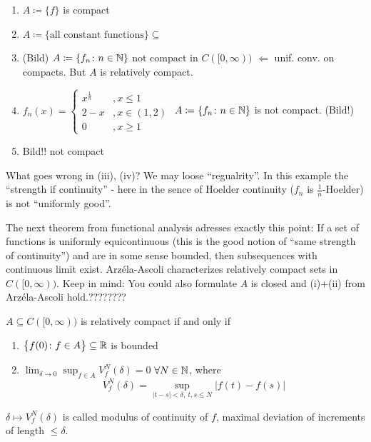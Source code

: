 \begin{example1}
	\begin{enumerate}[label=(\roman*)]
		\item $A \coloneqq \{ f \}$ is compact
		\item $A \coloneqq \{ \text{all constant functions}\} \subseteq$
		\item (Bild) $A \coloneqq \{ f_n \colon n\in \mathbb{N}\}$ not compact in $C([0,\infty))$ $\Leftarrow$ unif. conv. on compacts. But $A$ is relatively compact.
		\item $f_n(x) = \begin{cases}
			x^{\frac{1}{n}} &, x \leq 1 \\
			2-x &, x\in (1,2) \\
			0 &, x\geq 1
		\end{cases}$
		$A \coloneqq \{ f_n \colon n\in \mathbb{N}\}$ is not compact. (Bild!)
		\item Bild!! not compact
	\end{enumerate}
	What goes wrong in (iii), (iv)? We may loose \enquote{regualrity}. In this example the \enquote{strength if continuity} - here in the sence of Hoelder continuity ($f_n$ is $\frac{1}{n}$-Hoelder) is not \enquote{uniformly good}.
\end{example1}
The next theorem from functional analysis adresses exactly this point: If a set of functions is uniformly equicontinuous (this is the good notion of \enquote{same strength of continuity}) and are in some sense bounded, then subsequences with continuous limit exist. Arz\'ela-Ascoli characterizes relatively compact sets in $C([0,\infty))$. Keep in mind: You could also formulate $A$ is closed and (i)+(ii) from Arz\'ela-Ascoli hold.????????
\begin{lsatz}
\begin{theorem}
	$A \subseteq C([0,\infty))$ is relatively compact if and only if 
	\begin{enumerate}[label=(\roman*)]
		\item $\big\{ f(0)\colon f\in A\big\} \subseteq \mathbb{R}$ is bounded
		\item $\lim_{\delta \to 0} \sup_{f\in A} V_f^N(\delta) = 0 $   $\forall N \in \mathbb{N}$, where $$V_f^N(\delta) = \sup_{\lvert t - s \rvert < \delta, \: t,s \leq N} \lvert f(t)- f(s) \rvert$$
	\end{enumerate}
\end{theorem}
\end{lsatz}
$\delta \mapsto V_f^N(\delta)$ is called modulus of continuity of $f$, maximal deviation of increments of length $\leq \delta$.
